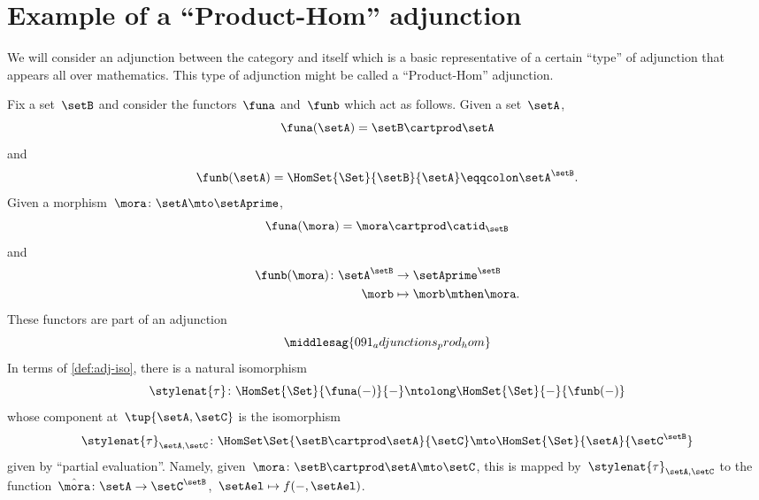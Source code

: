 
\section[Product-Hom adjunction]{Example of a ``Product-Hom'' adjunction}
We will consider an adjunction between the category \Set and itself which is a basic representative of a certain ``type'' of adjunction that appears all over mathematics.
This type of adjunction might be called a ``Product-Hom'' adjunction.

Fix a set~$\setB$ and consider the functors~$\funa$ and~$\funb$ which act as follows.
Given a set~$\setA$,
\begin{equation*}
	\funa(\setA) = \setB \cartprod \setA
\end{equation*}
and
\begin{equation*}
	\funb(\setA) = \HomSet{\Set}{\setB}{\setA} \eqqcolon \setA^\setB.
\end{equation*}
Given a morphism~$\mora\colon \setA \mto \setAprime$,
\begin{equation*}
	\funa(\mora) = \mora \cartprod \catid_\setB
\end{equation*}
and
\begin{equation*}
	\begin{aligned}
		\funb(\mora)\colon \setA^\setB & \to \setAprime^\setB        \\
		\morb                          & \mapsto \morb \mthen \mora.
	\end{aligned}
\end{equation*}
%
These functors are part of an adjunction
%
\begin{equation}
	\middlesag{091_adjunctions_prod_hom}
\end{equation}
In terms of \cref{def:adj-iso}, there is a natural isomorphism
\begin{equation*}
	\stylenat{\tau}\colon \HomSet{\Set}{\funa(- )}{-}  \ntolong   \HomSet{\Set}{-}{\funb( - )}
\end{equation*}
whose component at~$\tup{\setA,\setC}$ is the isomorphism
\begin{equation*}
	\stylenat{\tau}_{\setA,\setC} \colon \HomSet\Set{\setB\cartprod \setA}{\setC} \mto \HomSet{\Set}{\setA}{\setC^\setB}
\end{equation*}
given by ``partial evaluation''.
Namely, given~$\mora \colon \setB \cartprod \setA \mto \setC$, this is mapped by~$\stylenat{\tau}_{\setA,\setC}$ to the function~$\hat \mora \colon \setA \to \setC^\setB$,~$\setAel \mapsto f( -, \setAel)$.

